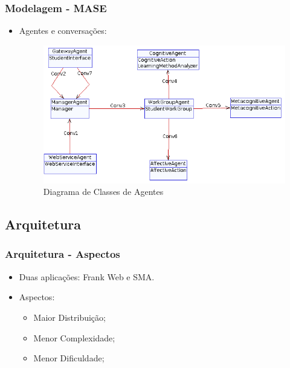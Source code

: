 \documentclass{beamer}
\begin{document}
\begin{frame}
    \frametitle{Modelagem - MASE}
    \begin{itemize}
        \item Agentes e conversações:
	 \begin{figure}[h]
    		\centering \includegraphics[scale=0.3]{../images/agent-class-diagram.png}
    		\caption{Diagrama de Classes de Agentes}
		\label{agentClassDiagram} 
	\end{figure}
    \end{itemize}
\end{frame}

\subsection{Arquitetura}
\begin{frame}
    \frametitle{Arquitetura - Aspectos}
    \begin{itemize}
        \item Duas aplicações: Frank Web e SMA.
        \item Aspectos:
	\begin{itemize}
		\item Maior Distribuição;
		\item Menor Complexidade;
		\item Menor Dificuldade;
	\end{itemize}
    \end{itemize}
\end{frame}
\end{document}
